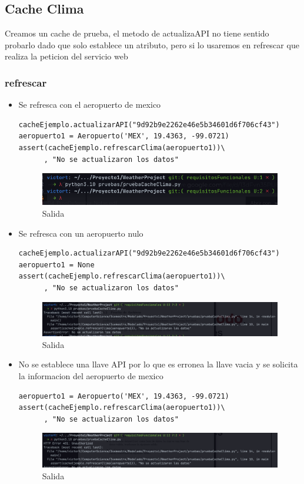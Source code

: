 \documentclass[12pt]{article}
\begin{document}
\subsection{Cache Clima}
Creamos un cache de prueba, el metodo de actualizaAPI no tiene sentido probarlo dado que solo establece un atributo, pero si lo usaremos en refrescar que realiza la peticion del servicio web
\subsubsection{refrescar}
\begin{itemize}
\item Se refresca con el aeropuerto de mexico
\begin{verbatim}
cacheEjemplo.actualizarAPI("9d92b9e2262e46e5b34601d6f706cf43")
aeropuerto1 = Aeropuerto('MEX', 19.4363, -99.0721)
assert(cacheEjemplo.refrescarClima(aeropuerto1))\
      , "No se actualizaron los datos"
\end{verbatim}
  
    \begin{figure}[h!]
    \centering
    \includegraphics[scale=0.6]{pruebasPy/cache/bien.png}
    \caption{Salida}
  \end{figure}
\item Se refresca con un aeropuerto nulo
\begin{verbatim}
cacheEjemplo.actualizarAPI("9d92b9e2262e46e5b34601d6f706cf43")
aeropuerto1 = None
assert(cacheEjemplo.refrescarClima(aeropuerto1))\
      , "No se actualizaron los datos"
\end{verbatim}
\begin{figure}[h!]
    \centering
    \includegraphics[scale=0.4]{pruebasPy/cache/refrescaMal.png}
    \caption{Salida}
  \end{figure}
\item No se establece una llave API por lo que es erronea la llave vacia y se solicita la informacion del aeropuerto de mexico
\begin{verbatim}
aeropuerto1 = Aeropuerto('MEX', 19.4363, -99.0721)
assert(cacheEjemplo.refrescarClima(aeropuerto1))\
      , "No se actualizaron los datos"
\end{verbatim}
  \newpage
\begin{figure}[h!]
    \centering
    \includegraphics[scale=0.4]{pruebasPy/cache/refrescaApiMal.png}
    \caption{Salida}
  \end{figure}
\end{itemize}
\end{document}
